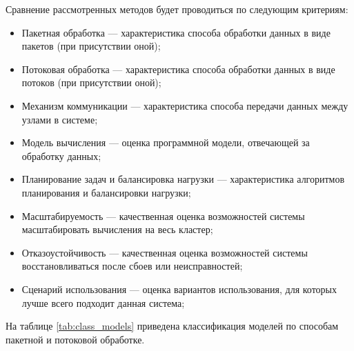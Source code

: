 
Сравнение рассмотренных методов будет проводиться по следующим критериям:
\begin{itemize}
    \item Пакетная обработка --- характеристика способа обработки данных в виде пакетов (при присутствии оной);
    \item Потоковая обработка --- характеристика способа обработки данных в виде потоков (при присутствии оной);
    \item Механизм коммуникации --- характеристика способа передачи данных между узлами в системе;
    \item Модель вычисления --- оценка программной модели, отвечающей за обработку данных;
    \item Планирование задач и балансировка нагрузки --- характеристика алгоритмов планирования и балансировки нагрузки;
    \item Масштабируемость --- качественная оценка возможностей системы масштабировать вычисления на весь кластер;
    \item Отказоустойчивость --- качественная оценка возможностей системы восстановливаться после сбоев или неисправностей;
    \item Сценарий использования --- оценка вариантов использования, для которых лучше всего подходит данная система;
\end{itemize}

\clearpage

На таблице \ref{tab:class_models} приведена классификация моделей по способам пакетной и потоковой обработке.

